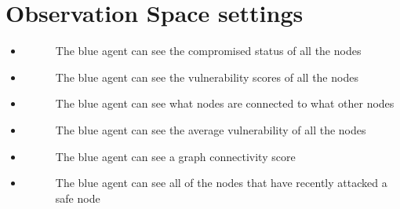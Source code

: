 \documentclass[letterpaper,10pt,english]{sphinxmanual}
\begin{document}
\section{Observation Space settings}
\label{\detokenize{source/config_file:observation-space-settings}}\begin{itemize}
\item {} \begin{description}
\item[{}] \leavevmode
\sphinxAtStartPar
The blue agent can see the compromised status of all the nodes

\end{description}

\item {} \begin{description}
\item[{}] \leavevmode
\sphinxAtStartPar
The blue agent can see the vulnerability scores of all the nodes

\end{description}

\item {} \begin{description}
\item[{}] \leavevmode
\sphinxAtStartPar
The blue agent can see what nodes are connected to what other nodes

\end{description}

\item {} \begin{description}
\item[{}] \leavevmode
\sphinxAtStartPar
The blue agent can see the average vulnerability of all the nodes

\end{description}

\item {} \begin{description}
\item[{}] \leavevmode
\sphinxAtStartPar
The blue agent can see a graph connectivity score

\end{description}

\item {} \begin{description}
\item[{}] \leavevmode
\sphinxAtStartPar
The blue agent can see all of the nodes that have recently attacked a safe node


\end{description}
\end{itemize}
\end{document}
